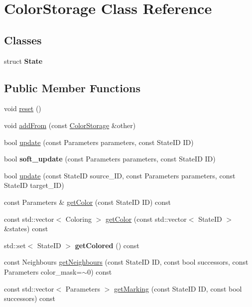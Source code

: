 \hypertarget{class_color_storage}{\section{Color\-Storage Class Reference}
\label{class_color_storage}
}
\subsection*{Classes}
\begin{DoxyCompactItemize}
\item 
struct {\bfseries State}
\end{DoxyCompactItemize}
\subsection*{Public Member Functions}
\begin{DoxyCompactItemize}
\item 
void \hyperlink{class_color_storage_a28df40cbd88c30ab37be0eb8ac868007}{reset} ()
\item 
void \hyperlink{class_color_storage_aff6195f205660f815b170679f90b23f3}{add\-From} (const \hyperlink{class_color_storage}{Color\-Storage} \&other)
\item 
bool \hyperlink{class_color_storage_aad8adffb169dc0994ed7a96e321c2782}{update} (const Parameters parameters, const State\-I\-D I\-D)
\item 
\hypertarget{class_color_storage_a03881ec96470f1b6bb096f758ec577b4}{bool {\bfseries soft\-\_\-update} (const Parameters parameters, const State\-I\-D I\-D)}\label{class_color_storage_a03881ec96470f1b6bb096f758ec577b4}

\item 
bool \hyperlink{class_color_storage_aeb1ade3680bf4e1c3c3b051b74b25b61}{update} (const State\-I\-D source\-\_\-\-I\-D, const Parameters parameters, const State\-I\-D target\-\_\-\-I\-D)
\item 
const Parameters \& \hyperlink{class_color_storage_a1d2ab2dbea53e5bb6ce4fd312d74a5b6}{get\-Color} (const State\-I\-D I\-D) const 
\item 
const std\-::vector$<$ Coloring $>$ \hyperlink{class_color_storage_aca489cd7f6bff18444ffd84ab82b3d17}{get\-Color} (const std\-::vector$<$ State\-I\-D $>$ \&states) const 
\item 
\hypertarget{class_color_storage_a0873ca34bf07bde29f7f5fe74d86b384}{std\-::set$<$ State\-I\-D $>$ {\bfseries get\-Colored} () const }\label{class_color_storage_a0873ca34bf07bde29f7f5fe74d86b384}

\item 
const Neighbours \hyperlink{class_color_storage_afde548e9f79bdc0c1a7597c5f0961477}{get\-Neighbours} (const State\-I\-D I\-D, const bool successors, const Parameters color\-\_\-mask=$\sim$0) const 
\item 
const std\-::vector$<$ Parameters $>$ \hyperlink{class_color_storage_af654149ac37d241bac3406c096eca7a3}{get\-Marking} (const State\-I\-D I\-D, const bool successors) const 
\end{DoxyCompactItemize}

